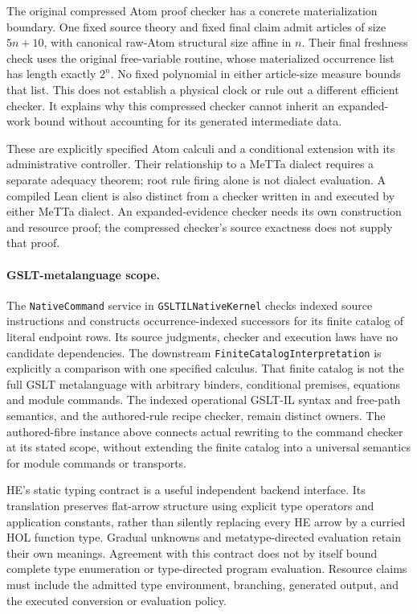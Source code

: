 \documentclass[11pt]{article}
\newcommand{\code}[1]{\nolinkurl{#1}}
\begin{document}
The original compressed Atom proof checker has a concrete materialization
boundary. One fixed source theory and fixed final claim admit articles of
size $5n+10$, with canonical raw-Atom structural size affine in $n$.
Their final freshness check uses the original free-variable routine, whose
materialized occurrence list has length exactly $2^n$. No fixed polynomial
in either article-size measure bounds that list. This does not establish a
physical clock or rule out a different efficient checker. It explains why
this compressed checker cannot inherit an expanded-work bound without
accounting for its generated intermediate data.

These are explicitly specified Atom calculi and a conditional extension
with its administrative controller. Their relationship to a MeTTa dialect
requires a separate adequacy theorem; root rule firing alone is not dialect
evaluation. A compiled Lean client is also
distinct from a checker written in and executed by either MeTTa dialect.
An expanded-evidence checker needs its own construction and resource proof;
the compressed checker's source exactness does not supply that proof.

\paragraph{GSLT-metalanguage scope.}
The \code{NativeCommand} service in \code{GSLTILNativeKernel} checks
indexed source instructions and constructs occurrence-indexed successors for
its finite catalog of literal endpoint rows. Its source judgments, checker and
execution laws have no candidate dependencies. The downstream
\code{FiniteCatalogInterpretation} is explicitly a comparison with one
specified calculus. That finite catalog is
not the full GSLT metalanguage with arbitrary binders, conditional premises,
equations and module commands. The indexed operational GSLT-IL syntax and
free-path semantics, and the authored-rule recipe checker, remain distinct
owners. The authored-fibre instance above connects actual rewriting to the
command checker at its stated scope, without extending the finite catalog
into a universal semantics for module commands or transports.

HE's static typing contract is a useful independent backend interface. Its
translation preserves flat-arrow structure using explicit type operators and
application constants, rather than silently replacing every HE arrow by a
curried HOL function type. Gradual unknowns and metatype-directed evaluation
retain their own meanings. Agreement with this contract does not by itself
bound complete type enumeration or type-directed program evaluation. Resource
claims must include the admitted type environment, branching, generated output,
and the executed conversion or evaluation policy.
\end{document}
